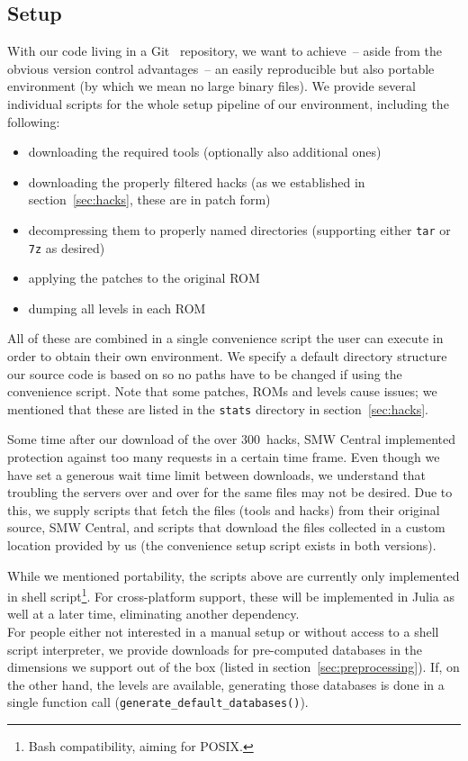\subsection{Setup}

With our code living in a Git~\cite{Git} repository, we want to
achieve~-- aside from the obvious version control advantages~-- an
easily reproducible but also portable environment (by which we mean no
large binary files). We provide several individual scripts for the
whole setup pipeline of our environment, including the following:
\begin{itemize}
\item downloading the required tools (optionally also additional ones)
\item downloading the properly filtered hacks (as we established in
  section~\ref{sec:hacks}, these are in patch form)
\item decompressing them to properly named directories (supporting
  either \texttt{tar} or \texttt{7z} as desired)
\item applying the patches to the original ROM
\item dumping all levels in each ROM
\end{itemize}
All of these are combined in a single convenience script the user can
execute in order to obtain their own environment. We specify a default
directory structure our source code is based on so no paths have to be
changed if using the convenience script. Note that some patches, ROMs
and levels cause issues; we mentioned that these are listed in the
\texttt{stats} directory in section~\ref{sec:hacks}.

Some time after our download of the over 300~hacks, SMW Central
implemented protection against too many requests in a certain time
frame. Even though we have set a generous wait time limit between
downloads, we understand that troubling the servers over and over for
the same files may not be desired. Due to this, we supply scripts that
fetch the files (tools and hacks) from their original source, SMW
Central, and scripts that download the files collected in a custom
location provided by us (the convenience setup script exists in both
versions).

While we mentioned portability, the scripts above are currently only
implemented in shell script\footnote{Bash compatibility, aiming for
  POSIX.}. For cross-platform support, these will be implemented in
Julia as well at a later time, eliminating another dependency. \\
For people either not interested in a manual setup or without access
to a shell script interpreter, we provide downloads for pre-computed
databases in the dimensions we support out of the box (listed in
section~\ref{sec:preprocessing}). If, on the other hand, the levels
are available, generating those databases is done in a single function
call (\texttt{generate_default_databases()}).

